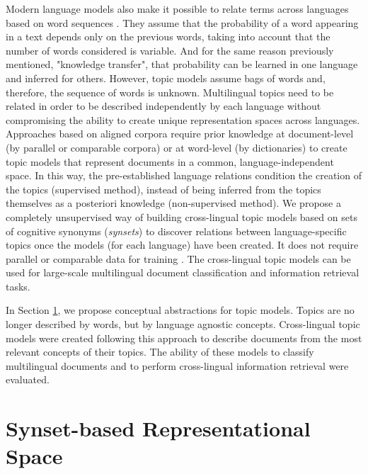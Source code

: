 Modern language models also make it possible to relate terms across languages based on word sequences \citep{Kaliyar2020}. They assume that the probability of a word appearing in a text depends only on the previous words, taking into account that the number of words considered is variable. And for the same reason previously mentioned, "knowledge transfer", that probability can be learned in one language and inferred for others. However, topic models assume bags of words and, therefore, the sequence of words is unknown. Multilingual topics need to be related in order to be described independently by each language without compromising the ability to create unique representation spaces across languages. Approaches based on aligned corpora require prior knowledge at document-level (by parallel or comparable corpora) or at word-level (by dictionaries) to create topic models that represent documents in a common, language-independent space. In this way, the pre-established language relations condition the creation of the topics (supervised method), instead of being inferred from the topics themselves as a posteriori knowledge (non-supervised method). We propose a completely unsupervised way of building cross-lingual topic models based on sets of cognitive synonyms (\textit{synsets}) \citep{Miller1995WordNet:English} to discover relations between language-specific topics once the models (for each language) have been created. It does not require parallel or comparable data for training \citep{Badenes-Olmedo2019, Badenes-Olmedo2019b}. The cross-lingual topic models can be used for large-scale multilingual document classification and information retrieval tasks.

In Section \ref{sec:synset-space}, we propose conceptual abstractions for topic models. Topics are no longer described by words, but by language agnostic concepts. Cross-lingual topic models were created following this approach to describe documents from the most relevant concepts of their topics. The ability of these models to classify multilingual documents and to perform cross-lingual information retrieval were evaluated.

\section{Synset-based Representational Space}
\label{sec:synset-space}

